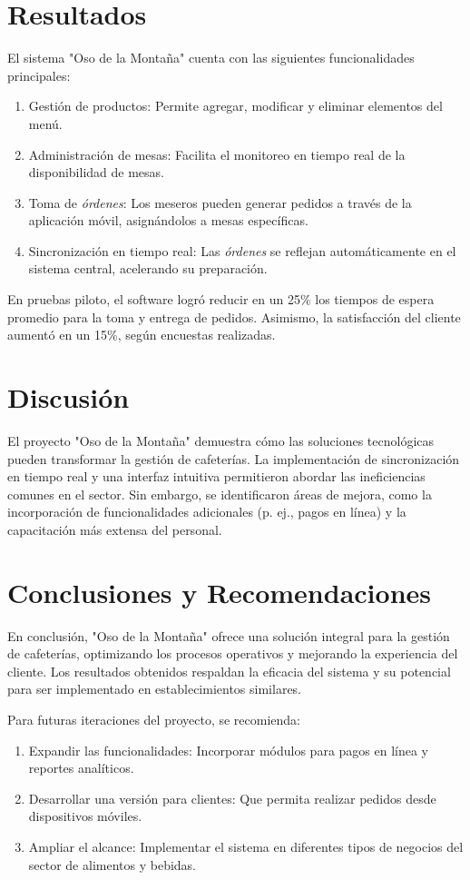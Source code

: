 \documentclass[12pt,a4paper]{article}
\begin{document}
\section{Resultados}
El sistema "Oso de la Monta\~na" cuenta con las siguientes funcionalidades principales:
\begin{enumerate}
    \item Gesti\'on de productos: Permite agregar, modificar y eliminar elementos del men\'u.
    \item Administraci\'on de mesas: Facilita el monitoreo en tiempo real de la disponibilidad de mesas.
    \item Toma de \textit{\'ordenes}: Los meseros pueden generar pedidos a trav\'es de la aplicaci\'on m\'ovil, asign\'andolos a mesas espec\'ificas.
    \item Sincronizaci\'on en tiempo real: Las \textit{\'ordenes} se reflejan autom\'aticamente en el sistema central, acelerando su preparaci\'on.
\end{enumerate}
En pruebas piloto, el software logr\'o reducir en un 25\% los tiempos de espera promedio para la toma y entrega de pedidos. Asimismo, la satisfacci\'on del cliente aument\'o en un 15\%, seg\'un encuestas realizadas.

\section{Discusi\'on}
El proyecto "Oso de la Monta\~na" demuestra c\'omo las soluciones tecnol\'ogicas pueden transformar la gesti\'on de cafeter\'ias. La implementaci\'on de sincronizaci\'on en tiempo real y una interfaz intuitiva permitieron abordar las ineficiencias comunes en el sector. Sin embargo, se identificaron \'areas de mejora, como la incorporaci\'on de funcionalidades adicionales (p. ej., pagos en l\'inea) y la capacitaci\'on m\'as extensa del personal.

\section{Conclusiones y Recomendaciones}
En conclusi\'on, "Oso de la Monta\~na" ofrece una soluci\'on integral para la gesti\'on de cafeter\'ias, optimizando los procesos operativos y mejorando la experiencia del cliente. Los resultados obtenidos respaldan la eficacia del sistema y su potencial para ser implementado en establecimientos similares.

Para futuras iteraciones del proyecto, se recomienda:
\begin{enumerate}
    \item Expandir las funcionalidades: Incorporar m\'odulos para pagos en l\'inea y reportes anal\'iticos.
    \item Desarrollar una versi\'on para clientes: Que permita realizar pedidos desde dispositivos m\'oviles.
    \item Ampliar el alcance: Implementar el sistema en diferentes tipos de negocios del sector de alimentos y bebidas.
\end{enumerate}
\end{document}
